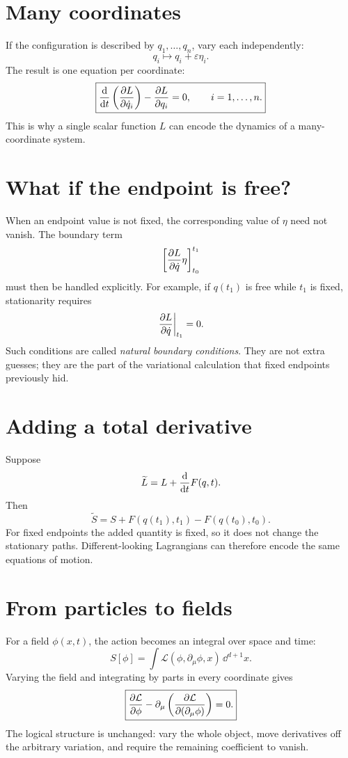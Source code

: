 \documentclass[11pt,a4paper]{article}
\begin{document}
\section{Many coordinates}

If the configuration is described by $q_1,\ldots,q_n$, vary each independently:
\[
q_i\mapsto q_i+\varepsilon\eta_i.
\]
The result is one equation per coordinate:
\[
\boxed{\frac{\mathop{}\!\mathrm d }{\mathop{}\!\mathrm d t}\left(\frac{\partial L}{\partial \dot q_i}\right)-\frac{\partial L}{\partial q_i}=0,
\qquad i=1,\ldots,n.}
\]
This is why a single scalar function $L$ can encode the dynamics of a many-coordinate system.

\section{What if the endpoint is free?}

When an endpoint value is not fixed, the corresponding value of $\eta$ need not vanish. The boundary term
\[
\left[\frac{\partial L}{\partial \dot q}\eta\right]_{t_0}^{t_1}
\]
must then be handled explicitly. For example, if $q(t_1)$ is free while $t_1$ is fixed, stationarity requires
\[
\left.\frac{\partial L}{\partial \dot q}\right|_{t_1}=0.
\]
Such conditions are called \emph{natural boundary conditions}. They are not extra guesses; they are the part of the variational calculation that fixed endpoints previously hid.

\section{Adding a total derivative}

Suppose
\[
\widetilde L=L+\frac{\mathop{}\!\mathrm d }{\mathop{}\!\mathrm d t}F(q,t).
\]
Then
\[
\widetilde S=S+F(q(t_1),t_1)-F(q(t_0),t_0).
\]
For fixed endpoints the added quantity is fixed, so it does not change the stationary paths. Different-looking Lagrangians can therefore encode the same equations of motion.

\section{From particles to fields}

For a field $\phi(x,t)$, the action becomes an integral over space and time:
\[
S[\phi]=\int \mathcal L(\phi,\partial_\mu\phi,x)\,\dd^{d+1}x.
\]
Varying the field and integrating by parts in every coordinate gives
\[
\boxed{
\frac{\partial \mathcal L}{\partial \phi}
-\partial_\mu\left(\frac{\partial \mathcal L}{\partial (\partial_\mu\phi)}\right)=0.
}
\]
The logical structure is unchanged: vary the whole object, move derivatives off the arbitrary variation, and require the remaining coefficient to vanish.
\end{document}
